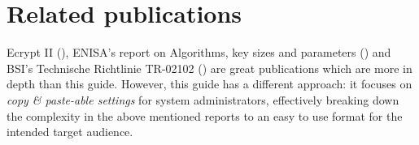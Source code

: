 \section{Related publications}
\label{section:relatedPublications}


Ecrypt II (\cite{ii2011ecrypt}), ENISA's report on Algorithms, key sizes and
parameters (\cite{ENISA2013}) and BSI's Technische Richtlinie TR-02102 (\cite{TR02102}) are
great publications which are more in depth than this guide.  However, this guide
has a different approach: it focuses on \emph{copy \& paste-able settings} for
system administrators, effectively breaking down the complexity in the above
mentioned reports to an easy to use format for the intended target audience. 





